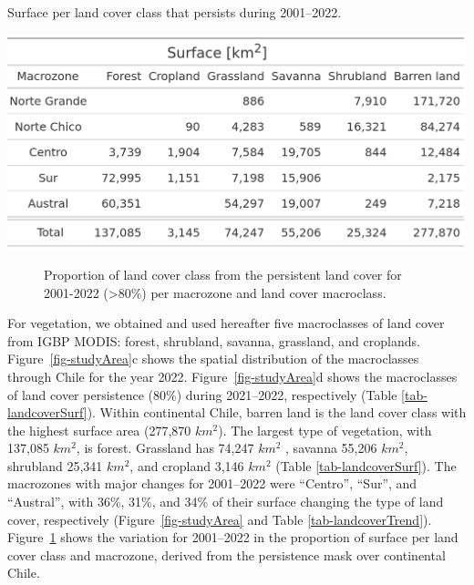 \documentclass[
  authoryear,
  preprint,
  3p,
  onecolumn]{elsarticle}
\begin{document}
\begin{table}[!ht]
\caption{Surface per land cover class that persists during 2001–2022.}
\label{tab-landcoverSurf}
\includegraphics[width = .5\textwidth]{../output/figs/table_surface_landcover_macrozone.png}
\end{table}

\begin{figure}[!ht]


\caption{\label{fig-LCprop}Proportion of land cover class from the
persistent land cover for 2001-2022 (\textgreater80\%) per macrozone and
land cover macroclass.}

\end{figure}%

For vegetation, we obtained and used hereafter five macroclasses of land
cover from IGBP MODIS: forest, shrubland, savanna, grassland, and
croplands. Figure~\ref{fig-studyArea}c shows the spatial distribution of
the macroclasses through Chile for the year 2022.
Figure~\ref{fig-studyArea}d shows the macroclasses of land cover
persistence (80\%) during 2021--2022, respectively (Table
\ref{tab-landcoverSurf}). Within continental Chile, barren land is the
land cover class with the highest surface area (277,870 \(km^2\)). The
largest type of vegetation, with 137,085 \(km^2\), is forest. Grassland
has 74,247 \(km^2\) , savanna 55,206 \(km^2\), shrubland 25,341
\(km^2\), and cropland 3,146 \(km^2\) (Table \ref{tab-landcoverSurf}).
The macrozones with major changes for 2001--2022 were ``Centro'',
``Sur'', and ``Austral'', with 36\%, 31\%, and 34\% of their surface
changing the type of land cover, respectively
(Figure~\ref{fig-studyArea} and Table \ref{tab-landcoverTrend}).
Figure~\ref{fig-LCprop} shows the variation for 2001--2022 in the
proportion of surface per land cover class and macrozone, derived from
the persistence mask over continental Chile.
\end{document}
